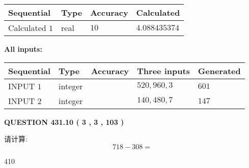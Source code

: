 \documentclass{ctexart}
\begin{document}
   
   
   
\noindent{}
   
   
  
  
\noindent\begin{tabular}{|l|l|l|l|}
\hline
 Sequential & Type & Accuracy & Calculated \\ 
\hline
 
 
  Calculated $  1 $ & real & $  10  $ & 
 $ 4.088435374 $ 
 \\  \hline  
 \end{tabular}
   
   
   
   
\noindent\vspace{0.1in}\hspace{-0.08in} {\textbf{\Large{All inputs: }}}
   
   
  
  
\noindent\begin{tabular}{|l|l|l|l|l|}
\hline
 Sequential & Type & Accuracy & Three inputs & Generated \\ 
\hline
 
 
  INPUT $  1 $ & integer &  & $
 520
 , 
 960
 , 
 3
 $ & $ 601 $ 
 \\  \hline  
 
 
  INPUT $  2 $ & integer &  & $
 140
 , 
 480
 , 
 7
 $ & $ 147 $ 
 \\  \hline  
 \end{tabular}
   
   
  
\vspace{0.2in}
  
{\textbf{\Large{QUESTION
431.10 
 ( 3 , 3 , 103 )
}}}
  
  
 
请计算:
\begin{equation}
718 -   %
308 = \nonumber
\end{equation}
 
 
 
\noindent{}
 
 

410
 
 
\noindent{}
 
 

 
 
 
\noindent{}
 
\end{document}
